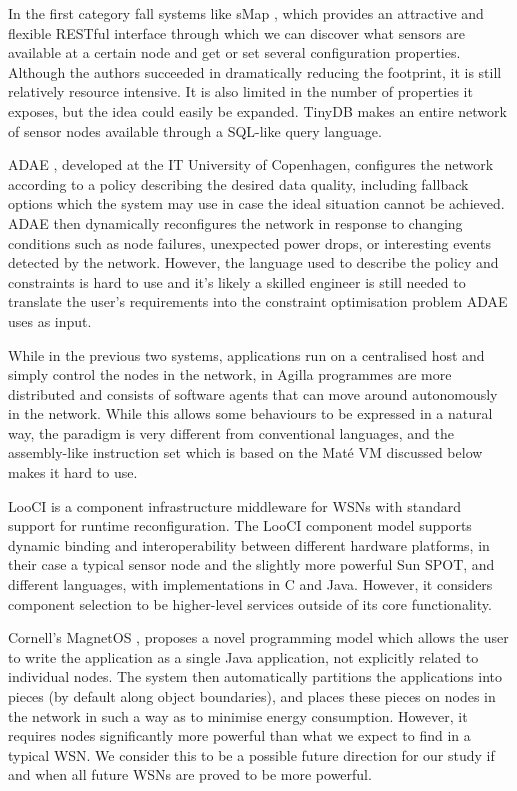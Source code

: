 In the first category fall systems like sMap \cite{DawsonHaggerty:2010eo}, which provides an attractive and flexible RESTful interface through which we can discover what sensors are available at a certain node and get or set several configuration properties. Although the authors succeeded in dramatically reducing the footprint, it is still relatively resource intensive. It is also limited in the number of properties it exposes, but the idea could easily be expanded. TinyDB \cite{Madden:2005tj} makes an entire network of sensor nodes available through a SQL-like query language.

ADAE \cite{Chang:2010ek}, developed at the IT University of Copenhagen, configures the network according to a policy describing the desired data quality, including fallback options which the system may use in case the ideal situation cannot be achieved. ADAE then dynamically reconfigures the network in response to changing conditions such as node failures, unexpected power drops, or interesting events detected by the network. However, the language used to describe the policy and constraints is hard to use and it’s likely a skilled engineer is still needed to translate the user’s requirements into the constraint optimisation problem ADAE uses as input.

While in the previous two systems, applications run on a centralised host and simply control the nodes in the network, in Agilla \cite{Fok:2005bh} programmes are more distributed and consists of software agents that can move around autonomously in the network. While this allows some behaviours to be expressed in a natural way, the paradigm is very different from conventional languages, and the assembly-like instruction set which is based on the Maté VM \cite{Levis:2002ku} discussed below makes it hard to use.

LooCI \cite{Hughes:dg} is a component infrastructure middleware for WSNs with standard support for runtime reconfiguration. The LooCI component model supports dynamic binding and interoperability between different hardware platforms, in their case a typical sensor node and the slightly more powerful Sun SPOT, and different languages, with implementations in C and Java. However, it considers component selection to be higher-level services outside of its core functionality.

Cornell’s MagnetOS \cite{Liu:2005wsa}, proposes a novel programming model which allows the user to write the application as a single Java application, not explicitly related to individual nodes. The system then automatically partitions the applications into pieces (by default along object boundaries), and places these pieces on nodes in the network in such a way as to minimise energy consumption. However, it requires nodes significantly more powerful than what we expect to find in a typical WSN. We consider this to be a possible future direction for our study if and when all future WSNs are proved to be more powerful.

